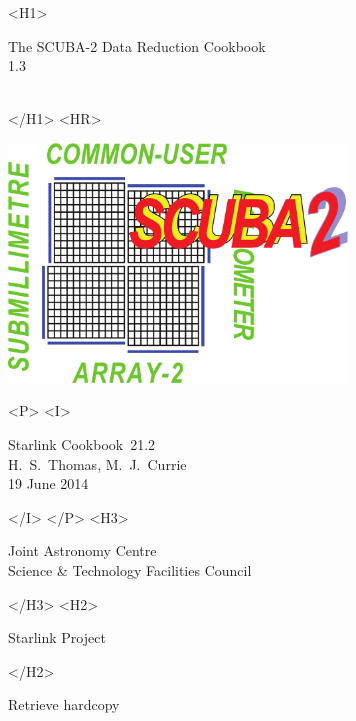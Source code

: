 \documentclass[twoside,11pt]{article}
\newcommand{\stardoccategory}  {Starlink Cookbook}
\newcommand{\stardocsource}    {sc\stardocnumber}
\newcommand{\stardocnumber}    {21.2}
\newcommand{\stardocauthors}   {H.\ S.\ Thomas, M.\ J.\ Currie}
\newcommand{\stardocdate}      {19 June 2014}
\newcommand{\stardoctitle}     {The SCUBA-2 Data Reduction Cookbook}
\newcommand{\stardocversion}   {1.3}
\newcommand{\stardocmanual}    {\ }
\newcommand{\htmladdnormallink}[2]{#1}
\newcommand{\htmladdimg}[1]{}
\newcommand{\xlabel}[1]{}
\renewcommand{\_}{\texttt{\symbol{95}}}
\begin{document}
\begin{htmlonly}
   \xlabel{}
   \begin{rawhtml} <H1> \end{rawhtml}
      \stardoctitle\\
      \stardocversion\\
      \stardocmanual
   \begin{rawhtml} </H1> <HR> \end{rawhtml}

   \includegraphics[width=90mm]{sc21_s2logo}

   \begin{rawhtml} <P> <I> \end{rawhtml}
   \stardoccategory\ \stardocnumber \\
   \stardocauthors \\
   \stardocdate
   \begin{rawhtml} </I> </P> <H3> \end{rawhtml}
      \htmladdnormallink{Joint Astronomy Centre}
                        {http://www.jach.hawaii.edu}\\
      \htmladdnormallink{Science \& Technology Facilities Council}
                        {http://www.scitech.ac.uk} \\
   \begin{rawhtml} </H3> <H2> \end{rawhtml}
      \htmladdnormallink{Starlink Project}{http://www.starlink.ac.uk/}
   \begin{rawhtml} </H2> \end{rawhtml}
   \htmladdnormallink{\htmladdimg{source.gif} Retrieve hardcopy}
      {http://www.starlink.ac.uk/cgi-bin/hcserver?\stardocsource}\\


\end{htmlonly}
\end{document}

